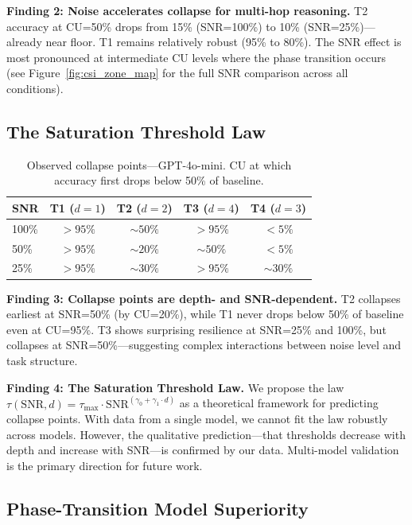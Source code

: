 \documentclass{article}
\begin{document}
\textbf{Finding 2: Noise accelerates collapse for multi-hop reasoning.} T2 accuracy at CU=50\% drops from 15\% (SNR=100\%) to 10\% (SNR=25\%)---already near floor. T1 remains relatively robust (95\% to 80\%). The SNR effect is most pronounced at intermediate CU levels where the phase transition occurs (see Figure~\ref{fig:csi_zone_map} for the full SNR comparison across all conditions).

\subsection{The Saturation Threshold Law}

\begin{table}[t]
\centering
\small
\caption{Observed collapse points---GPT-4o-mini. CU at which accuracy first drops below 50\% of baseline.}
\label{tab:threshold_mini}
\begin{tabular}{@{}lcccc@{}}
\toprule
SNR & T1 ($d{=}1$) & T2 ($d{=}2$) & T3 ($d{=}4$) & T4 ($d{=}3$) \\
\midrule
100\% & $>95\%$ & $\sim 50\%$ & $>95\%$ & $<5\%$ \\
50\%  & $>95\%$ & $\sim 20\%$ & $\sim 50\%$ & $<5\%$ \\
25\%  & $>95\%$ & $\sim 30\%$ & $>95\%$ & $\sim 30\%$ \\
\bottomrule
\end{tabular}
\end{table}

\textbf{Finding 3: Collapse points are depth- and SNR-dependent.} T2 collapses earliest at SNR=50\% (by CU=20\%), while T1 never drops below 50\% of baseline even at CU=95\%. T3 shows surprising resilience at SNR=25\% and 100\%, but collapses at SNR=50\%---suggesting complex interactions between noise level and task structure.

\textbf{Finding 4: The Saturation Threshold Law.} We propose the law $\tau(\mathrm{SNR}, d) = \tau_{\max} \cdot \mathrm{SNR}^{(\gamma_0 + \gamma_1 \cdot d)}$ as a theoretical framework for predicting collapse points. With data from a single model, we cannot fit the law robustly across models. However, the qualitative prediction---that thresholds decrease with depth and increase with SNR---is confirmed by our data. Multi-model validation is the primary direction for future work.

\subsection{Phase-Transition Model Superiority}
\end{document}
